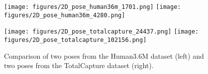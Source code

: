 \begin{figure}
	\centering
	\begin{minipage}{.45\textwidth}
		\texttt{[image: figures/2D\_pose\_human36m\_1701.png]}
		\texttt{[image: figures/2D\_pose\_human36m\_4280.png]}
	\end{minipage}
	\hspace{5mm}
	\begin{minipage}{.45\textwidth}
	\texttt{[image: figures/2D\_pose\_totalcapture\_24437.png]}
	\texttt{[image: figures/2D\_pose\_totalcapture\_102156.png]}
	\end{minipage}
	\caption{Comparison of two poses from the Human3.6M dataset (left) and two poses from the TotalCapture dataset (right).}
	\label{fig:human-totalcapture}
\end{figure}